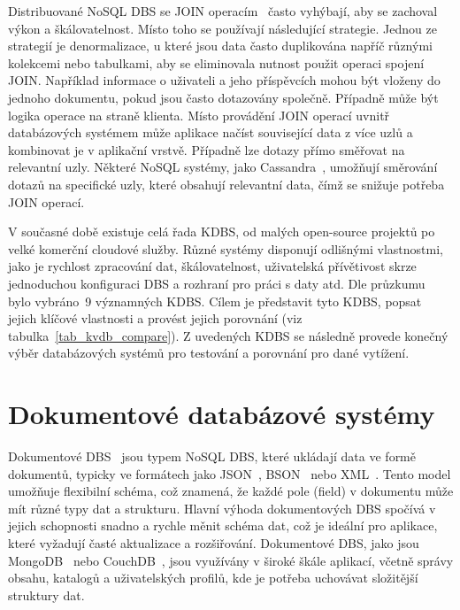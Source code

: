 \documentclass[czech,master,dept460,male,csharp,cpdeclaration]{diploma}
\begin{document}
	Distribuované NoSQL DBS se JOIN operacím~\cite{join} často vyhýbají, aby se zachoval výkon a škálovatelnost. Místo toho se používají následující strategie. Jednou ze strategií je denormalizace, u které jsou data často duplikována napříč různými kolekcemi nebo tabulkami, aby se eliminovala nutnost použit operaci spojení JOIN. Například informace o uživateli a jeho příspěvcích mohou být vloženy do jednoho dokumentu, pokud jsou často dotazovány společně. Případně může být logika operace na straně klienta. Místo provádění JOIN operací uvnitř databázových systémem může aplikace načíst související data z více uzlů a kombinovat je v aplikační vrstvě. Případně lze dotazy přímo směřovat na relevantní uzly. Některé NoSQL systémy, jako Cassandra~\cite{cassandra}, umožňují směrování dotazů na specifické uzly, které obsahují relevantní data, čímž se snižuje potřeba JOIN operací.
	
	V současné době existuje celá řada KDBS, od malých open-source projektů po velké komerční cloudové služby. Různé systémy disponují odlišnými vlastnostmi, jako je rychlost zpracování dat, škálovatelnost, uživatelská přívětivost skrze jednoduchou konfiguraci DBS a rozhraní pro práci s daty atd. Dle průzkumu~\cite{predictiveanalyticstoday,g2,db-engineers-ranking} bylo vybráno~9 významných KDBS. Cílem je představit tyto KDBS, popsat jejich klíčové vlastnosti a provést jejich porovnání (viz tabulka~\ref{tab_kvdb_compare}). Z uvedených KDBS se následně provede konečný výběr databázových systémů pro testování a porovnání pro dané vytížení.
	
	\section{Dokumentové databázové systémy}
	
	Dokumentové DBS~\cite{nosql, dokument-dbs} jsou typem NoSQL DBS, které ukládají data ve formě dokumentů, typicky ve formátech jako JSON~\cite{json}, BSON~\cite{bson} nebo XML~\cite{xml}. Tento model umožňuje flexibilní schéma, což znamená, že každé pole (field) v dokumentu může mít různé typy dat a strukturu. Hlavní výhoda dokumentových DBS spočívá v jejich schopnosti snadno a rychle měnit schéma dat, což je ideální pro aplikace, které vyžadují časté aktualizace a rozšiřování. Dokumentové DBS, jako jsou MongoDB~\cite{mongodb} nebo CouchDB~\cite{couchdb}, jsou využívány v široké škále aplikací, včetně správy obsahu, katalogů a uživatelských profilů, kde je potřeba uchovávat složitější struktury dat.
	
\end{document}
